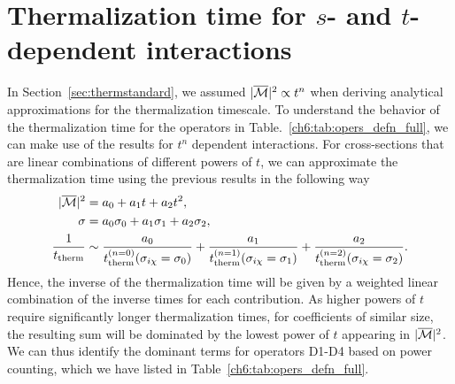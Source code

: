 \section{Thermalization time for $s$- and $t$-dependent interactions}
\label{ch6:sec:sdeptherm}


In Section~\ref{sec:thermstandard}, we assumed $|\overline{\mathcal M}|^2\propto t^n$ when deriving analytical approximations for the thermalization timescale. To understand the behavior of the thermalization time for the operators in Table.~\ref{ch6:tab:opers_defn_full}, we can make use of the results for $t^n$ dependent interactions. For cross-sections that are linear combinations of different powers of $t$, we can approximate the thermalization time using the previous results in the following way
\begin{align}
|\overline{\mathcal M}|^2 &= a_0 + a_1 t + a_2 t^2,\\
\sigma &= a_0\sigma_0 + a_1 \sigma_1 + a_2 \sigma_2,\\
\frac{1}{t_{\rm therm}} &\sim \frac{a_0}{ t_{\rm therm}^{(n=0)}(\sigma_{i\chi}=\sigma_0)} + \frac{a_1} {t_{\rm therm}^{(n=1)}(\sigma_{i\chi}=\sigma_1)} 
 + \frac{a_2}{  t_{\rm therm}^{(n=2)}(\sigma_{i\chi}=\sigma_2)}. 
\label{ch6:eq:ttherm_weighted}
\end{align}
Hence, the inverse of the thermalization time will be given by a weighted linear combination of the inverse times for each contribution. As higher powers of $t$ require significantly longer thermalization times, for coefficients of similar size, the resulting sum will be dominated by the lowest power of $t$ appearing in  $|\overline{\mathcal M}|^2$.  We can thus identify the dominant terms for operators D1-D4  based on power counting, which we have listed in Table~\ref{ch6:tab:opers_defn_full}.


